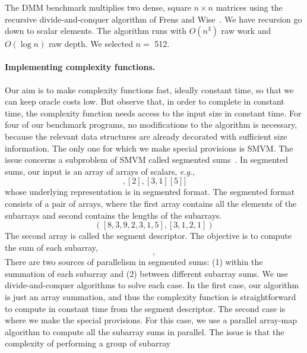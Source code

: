 The DMM benchmark multiplies two dense, square $n \times n$ matrices
using the recursive divide-and-conquer algorithm of Frens and
Wise~\cite{FrensWiseAutoblockingDMM}. We have recursion go down to
scalar elements. The algorithm runs with $O(n^3)$ raw work and $O(\log
n)$ raw depth. We selected $n=$ 512.

\paragraph{Implementing complexity functions.}

Our aim is to make complexity functions fast, ideally constant time,
so that we can keep oracle costs low. But observe that, in order to
complete in constant time, the complexity function needs access to the
input size in constant time. For four of our benchmark programs, no
modifications to the algorithm is necessary, because the relevant data
structures are already decorated with sufficient size information.
The only one for which we make special provisions is SMVM. The issue
concerns a subproblem of SMVM called segmented
sums~\cite{cray-mvmult}. In segmented sums, our input is an array of
arrays of scalars, \textit{e.g.},
\begin{displaymath}
[[8, 3, 9], [2], [3, 1] [5]]
\end{displaymath}
whose underlying representation is in segmented format. The segmented
format consists of a pair of arrays, where the first array contains
all the elements of the subarrays and second contains the lengths of
the subarrays.
\begin{displaymath}
([8, 3, 9, 2, 3, 1, 5], [3, 1, 2, 1])
\end{displaymath}
The second array is called the segment descriptor. The objective is to
compute the sum of each subarray,
\begin{displaymath}
[20, 2, 4, 5],
\end{displaymath}
There are two sources of parallelism in segmented sums: (1) within
the summation of each subarray and (2) between different subarray
sums. We use divide-and-conquer algorithms to solve each case. In the
first case, our algorithm is just an array summation, and
thus the complexity function is straightforward to
compute in constant time from the segment descriptor. The second
case is where we make the special provisions. For this case, we use a
parallel array-map algorithm to compute all the subarray sums in
parallel. The issue is that the complexity of performing a group of subarray
